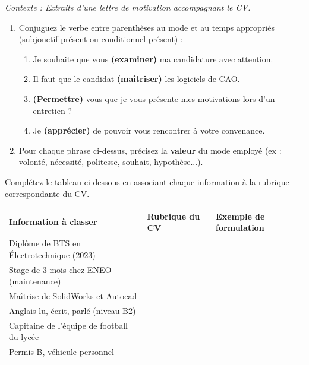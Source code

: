 \documentclass[11pt]{article}
\begin{document}
\begin{exercice}
\textit{Contexte : Extraits d'une lettre de motivation accompagnant le CV.}
\begin{enumerate}
    \item Conjuguez le verbe entre parenthèses au mode et au temps appropriés (subjonctif présent ou conditionnel présent) :
    \begin{enumerate}
        \item Je souhaite que vous \textbf{(examiner)} ma candidature avec attention.
        \item Il faut que le candidat \textbf{(maîtriser)} les logiciels de CAO.
        \item \textbf{(Permettre)}-vous que je vous présente mes motivations lors d'un entretien ?
        \item Je \textbf{(apprécier)} de pouvoir vous rencontrer à votre convenance.
    \end{enumerate}
    \item Pour chaque phrase ci-dessus, précisez la \textbf{valeur} du mode employé (ex : volonté, nécessité, politesse, souhait, hypothèse...).
\end{enumerate}
\end{exercice}

\begin{exercice}
Complétez le tableau ci-dessous en associant chaque information à la rubrique correspondante du CV.

\begin{tabular}{|p{4cm}|p{4cm}|p{6cm}|}
\hline
\textbf{Information à classer} & \textbf{Rubrique du CV} & \textbf{Exemple de formulation} \\
\hline
Diplôme de BTS en Électrotechnique (2023) & \dotfill & \dotfill \\
\hline
Stage de 3 mois chez ENEO (maintenance) & \dotfill & \dotfill \\
\hline
Maîtrise de SolidWorks et Autocad & \dotfill & \dotfill \\
\hline
Anglais lu, écrit, parlé (niveau B2) & \dotfill & \dotfill \\
\hline
Capitaine de l'équipe de football du lycée & \dotfill & \dotfill \\
\hline
Permis B, véhicule personnel & \dotfill & \dotfill \\
\hline
\end{tabular}
\end{exercice}
\end{document}

